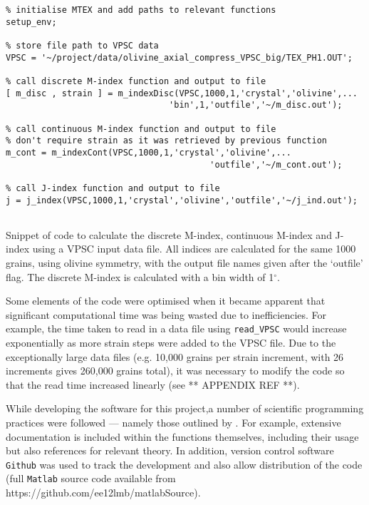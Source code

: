 \documentclass[a4paper,12pt]{report}
\numberwithin{equation}{chapter}
\begin{document}
\begin{program}[htbp] 
   \centering
   \begin{lstlisting}
% initialise MTEX and add paths to relevant functions
setup_env;   
   
% store file path to VPSC data
VPSC = '~/project/data/olivine_axial_compress_VPSC_big/TEX_PH1.OUT';

% call discrete M-index function and output to file
[ m_disc , strain ] = m_indexDisc(VPSC,1000,1,'crystal','olivine',...
                                'bin',1,'outfile','~/m_disc.out');

% call continuous M-index function and output to file
% don't require strain as it was retrieved by previous function
m_cont = m_indexCont(VPSC,1000,1,'crystal','olivine',...
                                        'outfile','~/m_cont.out');

% call J-index function and output to file
j = j_index(VPSC,1000,1,'crystal','olivine','outfile','~/j_ind.out');


 \end{lstlisting}
   \caption{Snippet of code to calculate the discrete M-index, continuous M-index and J-index using a VPSC input data file. All indices are calculated for the same 1000 grains, using olivine symmetry, with the output file names given after the \lq{}outfile\rq{} flag. The discrete M-index is calculated with a bin width of 1$^\circ$.}
   \label{lst:calcIndices}
\end{program}

Some elements of the code were optimised when it became apparent that significant computational time was being wasted due to inefficiencies. For example, the time taken to read in a data file using \texttt{read\_{}VPSC} would increase exponentially as more strain steps were added to the VPSC file. Due to the exceptionally large data files (e.g. 10,000 grains per strain increment, with 26 increments gives 260,000 grains total), it was necessary to modify the code so that the read time increased linearly (see ** APPENDIX REF **). 

While developing the software for this project,a number of scientific programming practices were followed --- namely those outlined by \cite{Wilson2014}. For example, extensive documentation is included within the functions themselves, including their usage but also references for relevant theory. In addition, version control software \texttt{Github} was used to track the development and also allow distribution of the code (full \texttt{Matlab} source code available from https://github.com/ee12lmb/matlabSource).
\end{document}
